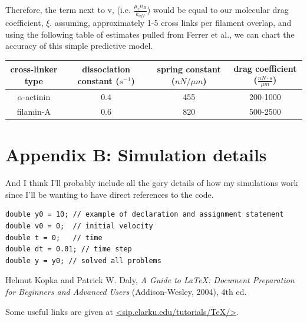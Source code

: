 \documentclass[prb,11pt]{revtex4-1}
\begin{document}
Therefore, the term next to v, (i.e. $\tfrac{\mu_c n_B}{k_{off}}$) would be equal to our molecular drag coefficient, $\xi$.  assuming, approximately 1-5 cross links per filament overlap, and using the following table of estimates pulled from Ferrer et al., we can chart the accuracy of this simple predictive model.

\begin{table}[h]
\begin{tabular}{c|c|c|c}
\textbf{cross-linker type} & \textbf{dissociation constant ($s^{-1}$)} & \textbf{spring constant ($nN / \mu m$)} & \textbf{drag coefficient ($\tfrac{nN \cdot s}{\mu m}$)} \\ \hline
$\alpha$-actinin & 0.4 & 455 & 200-1000 \\
filamin-A & 0.6 & 820 & 500-2500
\end{tabular}
\end{table}

\section{Appendix B: Simulation details}
And I think I'll probably include all the gory details of how my simulations work since I'll be wanting to have direct references to the code. 
\begin{verbatim}
double y0 = 10; // example of declaration and assignment statement
double v0 = 0;  // initial velocity
double t = 0;   // time
double dt = 0.01; // time step
double y = y0; // solved all problems
\end{verbatim}




\begin{thebibliography}{5}

Helmut Kopka and Patrick W. Daly, \textsl{A Guide to
\LaTeX: Document Preparation for Beginners and Advanced Users} (Addison-Wesley, 2004), 4th ed.

Some useful links are
given at \url{<sip.clarku.edu/tutorials/TeX/>}.

\end{thebibliography}
\end{document}
